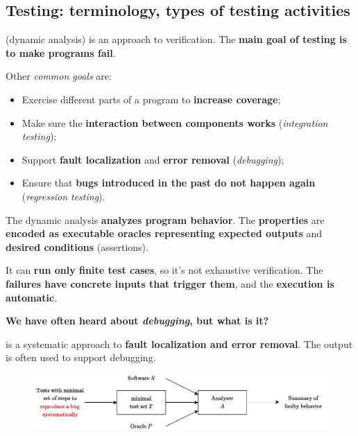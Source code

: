 \subsection{Testing: terminology, types of testing activities}

 (dynamic analysis) is an approach to verification. The \textbf{main goal of testing is to make programs fail}.

Other \emph{common goals} are:
\begin{itemize}
    \item Exercise different parts of a program to \textbf{increase coverage};
    
    \item Make sure the \textbf{interaction between components works} (\emph{integration testing});
    
    \item Support \textbf{fault localization} and \textbf{error removal} (\emph{debugging});
    
    \item Ensure that \textbf{bugs introduced in the past do not happen again} (\emph{regression testing}).
\end{itemize}
The dynamic analysis \textbf{analyzes program behavior}. The \textbf{properties} are \textbf{encoded as executable oracles representing expected outputs} and \textbf{desired conditions} (assertions).

It can \textbf{run only finite test cases}, so it's not exhaustive verification. The \textbf{failures have concrete inputs that trigger them}, and the \textbf{execution is automatic}.

\begin{flushleft}
    \textcolor{Green3}{ \textbf{We have often heard about \emph{debugging}, but what is it?}}
\end{flushleft}
 is a systematic approach to \textbf{fault localization and error removal}. The output is often used to support debugging.

\begin{figure}[!htp]
    \centering
    \includegraphics[width=\textwidth]{img/testing-1.pdf}
\end{figure}

